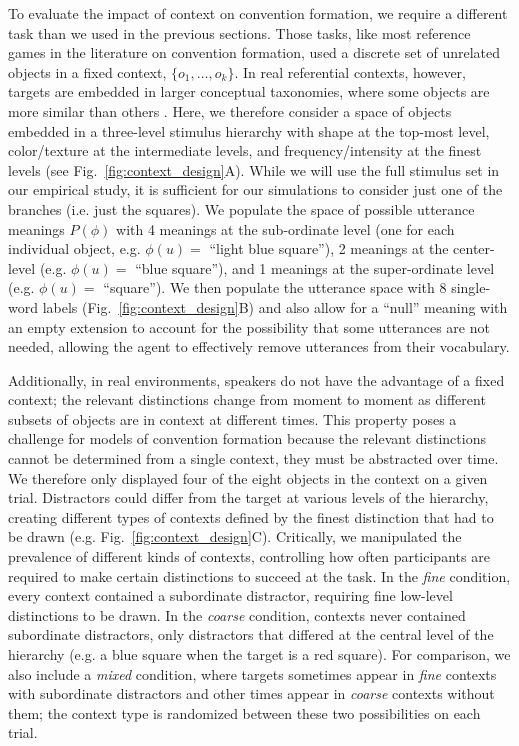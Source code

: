 To evaluate the impact of context on convention formation, we require a different task than we used in the previous sections.
Those tasks, like most reference games in the literature on convention formation, used a discrete set of unrelated objects in a fixed context, $\{o_1, \dots, o_k\}$. 
In real referential contexts, however, targets are embedded in larger conceptual taxonomies, where some objects are more similar than others \cite{bruner1956study,collins1969retrieval,XuTenenbaum07_WordLearningBayesian}.
Here, we therefore consider a space of objects embedded in a three-level stimulus hierarchy with shape at the top-most level, color/texture at the intermediate levels, and frequency/intensity at the finest levels (see Fig.~\ref{fig:context_design}A). 
While we will use the full stimulus set in our empirical study, it is sufficient for our simulations to consider just one of the branches (i.e. just the squares).
We populate the space of possible utterance meanings $P(\phi)$ with 4 meanings at the sub-ordinate level (one for each individual object, e.g. $\phi(u) =$ ``light blue square''), 2 meanings at the center-level (e.g. $\phi(u) =$ ``blue square''), and 1 meanings at the super-ordinate level (e.g. $\phi(u) =$ ``square'').
We then populate the utterance space with 8 single-word labels (Fig.~\ref{fig:context_design}B) and also allow for a ``null'' meaning with an empty extension to account for the possibility that some utterances are not needed, allowing the agent to effectively remove utterances from their vocabulary.

Additionally, in real environments, speakers do not have the advantage of a fixed context; the relevant distinctions change from moment to moment as different subsets of objects are in context at different times. 
This property poses a challenge for models of convention formation because the relevant distinctions cannot be determined from a single context, they must be abstracted over time.
We therefore only displayed four of the eight objects in the context on a given trial.
Distractors could differ from the target at various levels of the hierarchy, creating different types of contexts defined by the finest distinction that had to be drawn (e.g. Fig.~\ref{fig:context_design}C).  
Critically, we manipulated the prevalence of different kinds of contexts, controlling how often participants are required to make certain distinctions to succeed at the task. 
In the \emph{fine} condition, every context contained a subordinate distractor, requiring fine low-level distinctions to be drawn.
In the \emph{coarse} condition, contexts never contained subordinate distractors, only distractors that differed at the central level of the hierarchy (e.g. a blue square when the target is a red square).
For comparison, we also include a \emph{mixed} condition, where targets sometimes appear in \emph{fine} contexts with subordinate distractors and other times appear in \emph{coarse} contexts without them; the context type is randomized between these two possibilities on each trial.

